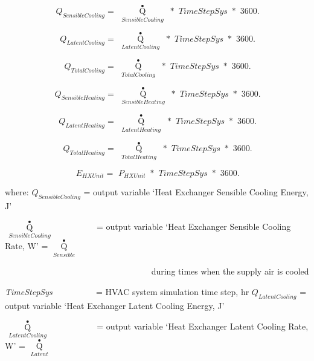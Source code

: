 \begin{equation}
\,{Q_{SensibleCooling}} = \,\,{\mathop Q\limits^ \bullet_{SensibleCooling}}\,\, * \,\,TimeStepSys\,\, * \,\,3600.
\end{equation}

\begin{equation}
\,{Q_{LatentCooling}} = \,\,{\mathop Q\limits^ \bullet_{LatentCooling}}\,\, * \,\,TimeStepSys\,\, * \,\,3600.
\end{equation}

\begin{equation}
\,{Q_{TotalCooling}} = \,\,{\mathop Q\limits^ \bullet_{TotalCooling}}\,\, * \,\,TimeStepSys\,\, * \,\,3600.
\end{equation}

\begin{equation}
\,{Q_{SensibleHeating}} = \,\,{\mathop Q\limits^ \bullet_{SensibleHeating}}\,\, * \,\,TimeStepSys\,\, * \,\,3600.
\end{equation}

\begin{equation}
\,{Q_{LatentHeating}} = \,\,{\mathop Q\limits^ \bullet_{LatentHeating}}\,\, * \,\,TimeStepSys\,\, * \,\,3600.
\end{equation}

\begin{equation}
\,{Q_{TotalHeating}} = \,\,{\mathop Q\limits^ \bullet_{TotalHeating}}\,\, * \,\,TimeStepSys\,\, * \,\,3600.
\end{equation}

\begin{equation}
\,{E_{HXUnit}} = \,\,{P_{HXUnit}}\,\, * \,\,TimeStepSys\,\, * \,\,3600.
\end{equation}

where: \(Q_{SensibleCooling}\) = output variable `Heat Exchanger Sensible Cooling Energy, J'

\(\,{\mathop Q\limits^ \bullet_{SensibleCooling}}\) ~~~~~~~~~ = output variable `Heat Exchanger Sensible Cooling Rate, W' = \({\mathop Q\limits^ \bullet_{Sensible}}\)

~~~~~~~~~~~~~~~~~~~~~~~~~~~~~~~~~~ during times when the supply air is cooled

\emph{TimeStepSys} ~~~~~~~~~ = HVAC system simulation time step, hr \(Q_{LatentCooling}\) = output variable `Heat Exchanger Latent Cooling Energy, J'

\(\,{\mathop Q\limits^ \bullet_{LatentCooling}}\) ~~~~~~~~~~ = output variable `Heat Exchanger Latent Cooling Rate, W' = \({\mathop Q\limits^ \bullet_{Latent}}\)

